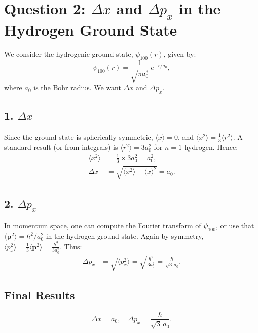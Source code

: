 \documentclass[12pt]{article}
\begin{document}


\section*{Question 2: $\Delta x$ and $\Delta p_x$ in the Hydrogen Ground State}

We consider the hydrogenic ground state, $\psi_{100}(r)$, given by:
\begin{equation}
\psi_{100}(r) = \frac{1}{\sqrt{\pi a_0^3}}\, e^{-r/a_0},
\end{equation}
where $a_0$ is the Bohr radius. We want $\Delta x$ and $\Delta p_x$.

\subsection*{1. $\Delta x$}
Since the ground state is spherically symmetric, $\langle x \rangle = 0$, and $\langle x^2\rangle = \frac{1}{3}\langle r^2\rangle$. A standard result (or from integrals) is $\langle r^2\rangle = 3 a_0^2$ for $n=1$ hydrogen. Hence:
\begin{align*}
\langle x^2 \rangle &= \frac{1}{3}\times 3 a_0^2 = a_0^2,\\
\Delta x &= \sqrt{\langle x^2\rangle - \langle x\rangle^2} = a_0.
\end{align*}

\subsection*{2. $\Delta p_x$}
In momentum space, one can compute the Fourier transform of $\psi_{100}$, or use that $\langle \mathbf{p}^2\rangle = \hbar^2 / a_0^2$ in the hydrogen ground state. Again by symmetry, $\langle p_x^2\rangle = \frac{1}{3}\langle \mathbf{p}^2\rangle = \frac{\hbar^2}{3 a_0^2}$. Thus:
\begin{align*}
\Delta p_x &= \sqrt{\langle p_x^2\rangle} = \sqrt{\frac{\hbar^2}{3 a_0^2}} = \frac{\hbar}{\sqrt{3}\,a_0}.
\end{align*}

\subsection*{Final Results}
\begin{equation}
\boxed{
\Delta x = a_0, \quad\Delta p_x = \frac{\hbar}{\sqrt{3}\,a_0}.
}
\end{equation}
\end{document}
